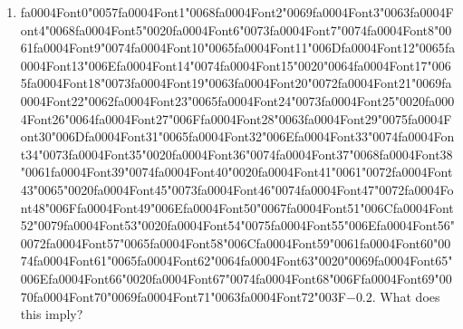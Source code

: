 \documentclass[12pt]{article}
\begin{document}
\begin{enumerate}[label=Q\arabic*.]
 \item {\csname fa0004Font0\endcsname\char"0057}{\csname fa0004Font1\endcsname\char"0068}{\csname fa0004Font2\endcsname\char"0069}{\csname fa0004Font3\endcsname\char"0063}{\csname fa0004Font4\endcsname\char"0068}{\csname fa0004Font5\endcsname\char"0020}{\csname fa0004Font6\endcsname\char"0073}{\csname fa0004Font7\endcsname\char"0074}{\csname fa0004Font8\endcsname\char"0061}{\csname fa0004Font9\endcsname\char"0074}{\csname fa0004Font10\endcsname\char"0065}{\csname fa0004Font11\endcsname\char"006D}{\csname fa0004Font12\endcsname\char"0065}{\csname fa0004Font13\endcsname\char"006E}{\csname fa0004Font14\endcsname\char"0074}{\csname fa0004Font15\endcsname\char"0020}{\char"0064}{\csname fa0004Font17\endcsname\char"0065}{\csname fa0004Font18\endcsname\char"0073}{\csname fa0004Font19\endcsname\char"0063}{\csname fa0004Font20\endcsname\char"0072}{\csname fa0004Font21\endcsname\char"0069}{\csname fa0004Font22\endcsname\char"0062}{\csname fa0004Font23\endcsname\char"0065}{\csname fa0004Font24\endcsname\char"0073}{\csname fa0004Font25\endcsname\char"0020}{\csname fa0004Font26\endcsname\char"0064}{\csname fa0004Font27\endcsname\char"006F}{\csname fa0004Font28\endcsname\char"0063}{\csname fa0004Font29\endcsname\char"0075}{\csname fa0004Font30\endcsname\char"006D}{\csname fa0004Font31\endcsname\char"0065}{\csname fa0004Font32\endcsname\char"006E}{\csname fa0004Font33\endcsname\char"0074}{\csname fa0004Font34\endcsname\char"0073}{\csname fa0004Font35\endcsname\char"0020}{\csname fa0004Font36\endcsname\char"0074}{\csname fa0004Font37\endcsname\char"0068}{\csname fa0004Font38\endcsname\char"0061}{\csname fa0004Font39\endcsname\char"0074}{\csname fa0004Font40\endcsname\char"0020}{\csname fa0004Font41\endcsname\char"0061}{\char"0072}{\csname fa0004Font43\endcsname\char"0065}{\char"0020}{\csname fa0004Font45\endcsname\char"0073}{\csname fa0004Font46\endcsname\char"0074}{\csname fa0004Font47\endcsname\char"0072}{\csname fa0004Font48\endcsname\char"006F}{\csname fa0004Font49\endcsname\char"006E}{\csname fa0004Font50\endcsname\char"0067}{\csname fa0004Font51\endcsname\char"006C}{\csname fa0004Font52\endcsname\char"0079}{\csname fa0004Font53\endcsname\char"0020}{\csname fa0004Font54\endcsname\char"0075}{\csname fa0004Font55\endcsname\char"006E}{\csname fa0004Font56\endcsname\char"0072}{\csname fa0004Font57\endcsname\char"0065}{\csname fa0004Font58\endcsname\char"006C}{\csname fa0004Font59\endcsname\char"0061}{\csname fa0004Font60\endcsname\char"0074}{\csname fa0004Font61\endcsname\char"0065}{\csname fa0004Font62\endcsname\char"0064}{\csname fa0004Font63\endcsname\char"0020}{\char"0069}{\csname fa0004Font65\endcsname\char"006E}{\csname fa0004Font66\endcsname\char"0020}{\csname fa0004Font67\endcsname\char"0074}{\csname fa0004Font68\endcsname\char"006F}{\csname fa0004Font69\endcsname\char"0070}{\csname fa0004Font70\endcsname\char"0069}{\csname fa0004Font71\endcsname\char"0063}{\csname fa0004Font72\endcsname\char"003F}$-0.2$. What does this imply?

\end{enumerate}
\end{document}
